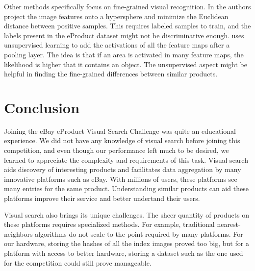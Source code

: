 \documentclass[conference]{IEEEtran}
\begin{document}
Other methods specifically focus on fine-grained visual recognition.
In \cite{zheng2019towards} the authors project the image features onto a hypersphere and
minimize the Euclidean distance between positive samples.
This requires labeled samples to train, and the labels present in the eProduct dataset
might not be discriminative enough.
\cite{wei2017selective} uses unsupervised learning to add the activations of all
the feature maps after a pooling layer.
The idea is that if an area is activated in many feature maps, the likelihood is
higher that it contains an object.
The unsupervised aspect might be helpful in finding the fine-grained differences
between similar products.

\section{Conclusion}
Joining the eBay eProduct Visual Search Challenge was quite an educational experience.
We did not have any knowledge of visual search before joining this competition, and even though 
our performance left much to be desired, we learned to appreciate the complexity and 
requirements of this task.
Visual search aids discovery of interesting products and facilitates data aggregation 
by many innovative platforms such as eBay.
With millions of users, these platforms see many entries for the same product.
Understanding similar products can aid these platforms improve their service and 
better undertand their users.

Visual search also brings its unique challenges.
The sheer quantity of products on these platforms requires specialized methods.
For example, traditional nearest-neighbors algorithms do not scale to the point
required by many platforms.
For our hardware, storing the hashes of all the index images proved too big,
but for a platform with access to better hardware, storing a dataset such as the 
one used for the competition could still prove manageable.

\printbibliography
\end{document}
